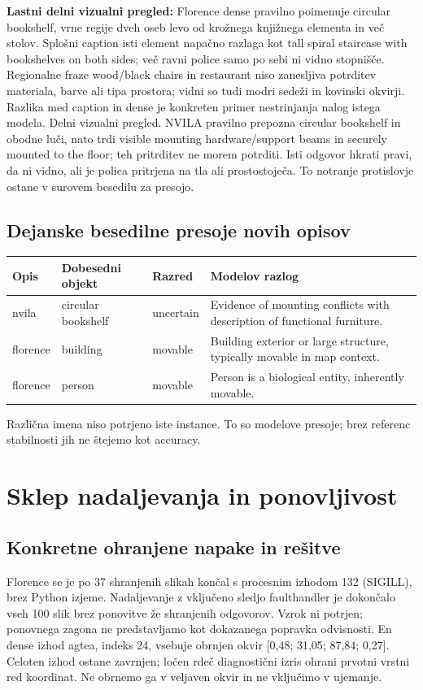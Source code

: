 \textbf{Lastni delni vizualni pregled:} Florence dense pravilno poimenuje circular bookshelf, vrne regije dveh oseb levo od krožnega knjižnega elementa in več stolov. Splošni caption isti element napačno razlaga kot tall spiral staircase with bookshelves on both sides; več ravni police samo po sebi ni vidno stopnišče. Regionalne fraze wood/black chairs in restaurant niso zanesljiva potrditev materiala, barve ali tipa prostora; vidni so tudi modri sedeži in kovinski okvirji. Razlika med caption in dense je konkreten primer nestrinjanja nalog istega modela. Delni vizualni pregled. NVILA pravilno prepozna circular bookshelf in obodne luči, nato trdi visible mounting hardware/support beams in securely mounted to the floor; teh pritrditev ne morem potrditi. Isti odgovor hkrati pravi, da ni vidno, ali je polica pritrjena na tla ali prostostoječa. To notranje protislovje ostane v surovem besedilu za presojo.
\subsection*{Dejanske besedilne presoje novih opisov}\begin{center}\small\begin{tabular}{p{1.6cm}p{4.2cm}p{1.8cm}p{7.6cm}}\toprule
Opis & Dobesedni objekt & Razred & Modelov razlog \\ \midrule
nvila & circular bookshelf & uncertain & Evidence of mounting conflicts with description of functional furniture. \\
florence & building & movable & Building exterior or large structure, typically movable in map context. \\
florence & person & movable & Person is a biological entity, inherently movable. \\
\bottomrule\end{tabular}\end{center}
Različna imena niso potrjeno iste instance. To so modelove presoje; brez referenc stabilnosti jih ne štejemo kot accuracy.

\newpage
\section*{Sklep nadaljevanja in ponovljivost}
\subsection*{Konkretne ohranjene napake in rešitve}
Florence se je po 37 shranjenih slikah končal s procesnim izhodom 132 (SIGILL), brez Python izjeme. Nadaljevanje z vključeno sledjo faulthandler je dokončalo vseh 100 slik brez ponovitve že shranjenih odgovorov. Vzrok ni potrjen; ponovnega zagona ne predstavljamo kot dokazanega popravka odvisnosti. En dense izhod agtea, indeks 24, vsebuje obrnjen okvir [0,48; 31,05; 87,84; 0,27]. Celoten izhod ostane zavrnjen; ločen rdeč diagnostični izris ohrani prvotni vrstni red koordinat. Ne obrnemo ga v veljaven okvir in ne vključimo v ujemanje.

